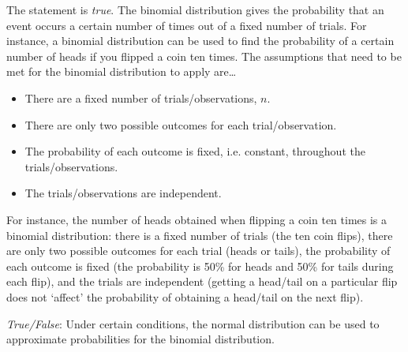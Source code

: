 \documentclass[11pt,letterpaper]{article}
\begin{document}
\sol The statement is \textit{true}. The binomial distribution gives the probability that an event occurs a certain number of times out of a fixed number of trials. For instance, a binomial distribution can be used to find the probability of a certain number of heads if you flipped a coin ten times. The assumptions that need to be met for the binomial distribution to apply are\dots
	\begin{itemize}
	\item There are a fixed number of trials/observations, $n$.
	\item There are only two possible outcomes for each trial/observation. 
	\item The probability of each outcome is fixed, i.e. constant, throughout the trials/observations.
	\item The trials/observations are independent. 
	\end{itemize}
For instance, the number of heads obtained when flipping a coin ten times is a binomial distribution: there is a fixed number of trials (the ten coin flips), there are only two possible outcomes for each trial (heads or tails), the probability of each outcome is fixed (the probability is 50\% for heads and 50\% for tails during each flip), and the trials are independent (getting a head/tail on a particular flip does not `affect' the probability of obtaining a head/tail on the next flip). \pvspace{1.3cm}



\quizsol \textit{True/False}: Under certain conditions, the normal distribution can be used to approximate probabilities for the binomial distribution. \pspace
\end{document}
